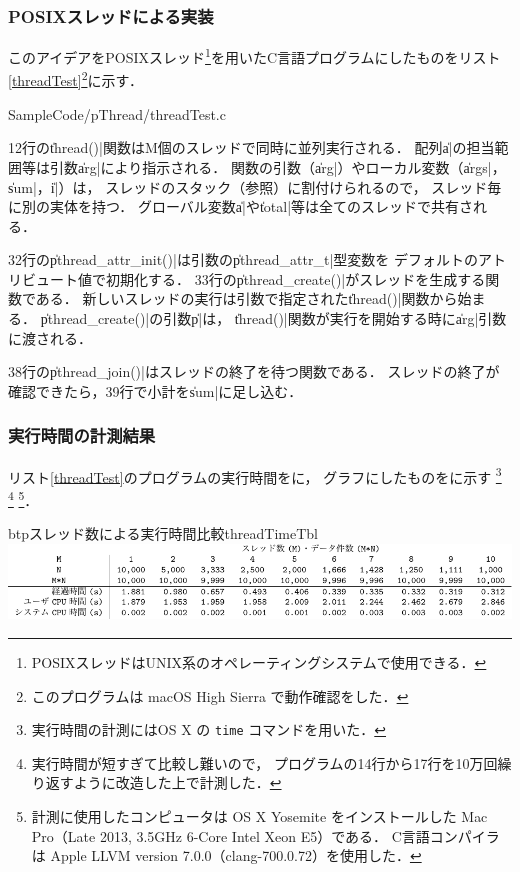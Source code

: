 \subsubsection{POSIXスレッドによる実装}
このアイデアをPOSIXスレッド\footnote{
  POSIXスレッドはUNIX系のオペレーティングシステムで使用できる．
}を用いたC言語プログラムにしたものをリスト\ref{threadTest}\footnote{
  このプログラムは macOS High Sierra で動作確認をした．
}に示す．


  {SampleCode/pThread/threadTest.c}

12行の\|thread()|関数はM個のスレッドで同時に並列実行される．
配列\|a|の担当範囲等は引数\|arg|により指示される．
関数の引数（\|arg|）やローカル変数（\|args|，\|sum|，\|i|）は，
スレッドのスタック（参照）に割付けられるので，
スレッド毎に別の実体を持つ．
グローバル変数\|a|や\|total|等は全てのスレッドで共有される．

32行の\|pthread_attr_init()|は引数の\|pthread_attr_t|型変数を
デフォルトのアトリビュート値で初期化する．
33行の\|pthread_create()|がスレッドを生成する関数である．
新しいスレッドの実行は引数で指定された\|thread()|関数から始まる．
\|pthread_create()|の引数\|p|は，
\|thread()|関数が実行を開始する時に\|arg|引数に渡される．

38行の\|pthread_join()|はスレッドの終了を待つ関数である．
スレッドの終了が確認できたら，39行で小計を\|sum|に足し込む．

\subsubsection{実行時間の計測結果}
リスト\ref{threadTest}のプログラムの実行時間をに，
グラフにしたものをに示す
\footnote{
  実行時間の計測にはOS X の \texttt{time} コマンドを用いた．
}
\footnote{
  実行時間が短すぎて比較し難いので，
  プログラムの14行から17行を10万回繰り返すように改造した上で計測した．}
\footnote{
  計測に使用したコンピュータは
  OS X Yosemite をインストールした
  Mac Pro（Late 2013, 3.5GHz 6-Core Intel Xeon E5）である．
  C言語コンパイラは
  Apple LLVM version 7.0.0（clang-700.0.72）を使用した．
}．

\begin{mytable}{btp}{スレッド数による実行時間比較}{threadTimeTbl}
  \includegraphics[scale=1.0]{Tbl/threadTimeTbl.pdf}
\end{mytable}

